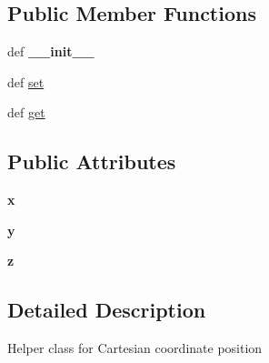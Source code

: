 \subsection*{Public Member Functions}
\begin{DoxyCompactItemize}
\item 
\hypertarget{classcore_1_1coreobj_1_1_position_abd15b635ac649341da5a0575ea78836e}{def {\bfseries \+\_\+\+\_\+init\+\_\+\+\_\+}}\label{classcore_1_1coreobj_1_1_position_abd15b635ac649341da5a0575ea78836e}

\item 
def \hyperlink{classcore_1_1coreobj_1_1_position_a1a107d48a6489b1f98d930c14e02d18f}{set}
\item 
def \hyperlink{classcore_1_1coreobj_1_1_position_a118fc82ece23bade1532cee0535bb3c0}{get}
\end{DoxyCompactItemize}
\subsection*{Public Attributes}
\begin{DoxyCompactItemize}
\item 
\hypertarget{classcore_1_1coreobj_1_1_position_a02ddd71e9b200b7f7f0bd2f24c82e822}{{\bfseries x}}\label{classcore_1_1coreobj_1_1_position_a02ddd71e9b200b7f7f0bd2f24c82e822}

\item 
\hypertarget{classcore_1_1coreobj_1_1_position_ad578e5eeaf399847f9f09e4689644da2}{{\bfseries y}}\label{classcore_1_1coreobj_1_1_position_ad578e5eeaf399847f9f09e4689644da2}

\item 
\hypertarget{classcore_1_1coreobj_1_1_position_a577928c1fda89509145bb52091e46c74}{{\bfseries z}}\label{classcore_1_1coreobj_1_1_position_a577928c1fda89509145bb52091e46c74}

\end{DoxyCompactItemize}


\subsection{Detailed Description}
\begin{DoxyVerb}Helper class for Cartesian coordinate position
\end{DoxyVerb}
 

